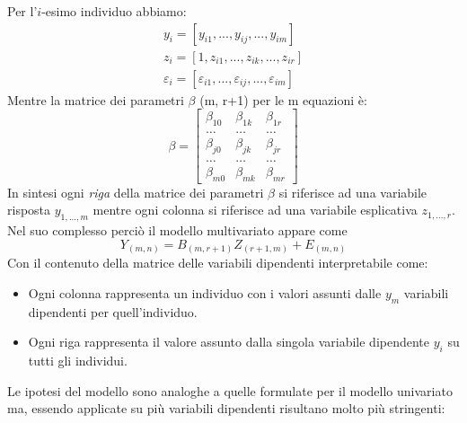 \documentclass[a4page, 11pt]{article} %
\begin{document}
Per l'$i$-esimo individuo abbiamo:
\begin{align*}
y_i = [y_{i1},...,y_{ij},...,y_{im}]\\
z_i = [1,z_{i1},...,z_{ik},...,z_{ir}]\\
\varepsilon_i = [\varepsilon_{i1},...,\varepsilon_{ij},...,\varepsilon_{im}]
\end{align*}
Mentre la matrice dei parametri $\beta$ (m, r+1) per le m equazioni è:
\[
\beta =
\begin{bmatrix}
\beta_{10} & \beta_{1k} & \beta_{1r} \\
\dots&\dots&\dots \\
\beta_{j0} & \beta_{jk} & \beta_{jr} \\
\dots&\dots&\dots \\
\beta_{m0} & \beta_{mk} & \beta_{mr} 
\end{bmatrix}
\]
In sintesi ogni \textit{riga} della matrice dei parametri $\beta$ si riferisce ad una variabile risposta $y_{1,...,m}$ mentre ogni colonna si riferisce ad una variabile esplicativa $z_{1,...,r}$. 
\newline
Nel suo complesso perciò il modello multivariato appare come $$ Y_{(m,n)} = B_{(m,r+1)}Z_{(r+1,m)} + E_{(m,n)}$$
Con il contenuto della matrice delle variabili dipendenti interpretabile come:
\begin{itemize}[noitemsep]
\item Ogni colonna rappresenta un individuo con i valori assunti dalle $y_m$ variabili dipendenti per quell'individuo.
\item Ogni riga rappresenta il valore assunto dalla singola variabile dipendente $y_i$ su tutti gli individui.
\end{itemize}
Le ipotesi del modello sono analoghe a quelle formulate per il modello univariato ma, essendo applicate su più variabili dipendenti risultano molto più stringenti:
\end{document}
